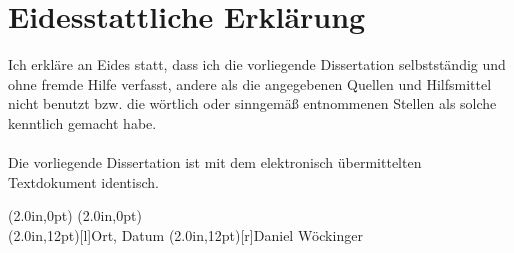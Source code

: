\section*{Eidesstattliche Erklärung}
\thispagestyle{prolog}
\bigskip

Ich erkläre an Eides statt, dass ich die vorliegende Dissertation selbstständig und ohne fremde Hilfe verfasst, andere als die angegebenen Quellen und Hilfsmittel nicht benutzt bzw. die wörtlich oder sinngemäß entnommenen Stellen als solche kenntlich gemacht habe.\\
\\
Die vorliegende Dissertation ist mit dem elektronisch übermittelten Textdokument identisch.\\
\vspace{25mm}

\makebox(2.0in,0pt){\hrulefill} \hfill \makebox(2.0in,0pt){\hrulefill} \hspace{2cm}\\
\makebox(2.0in,12pt)[l]{\scriptsize{Ort, Datum}} \hfill \makebox(2.0in,12pt)[r]{\scriptsize{Daniel Wöckinger}} \hspace{2cm}\\
\clearpage
\thispagestyle{emptyPage}
\hbox{ }
\clearpage
